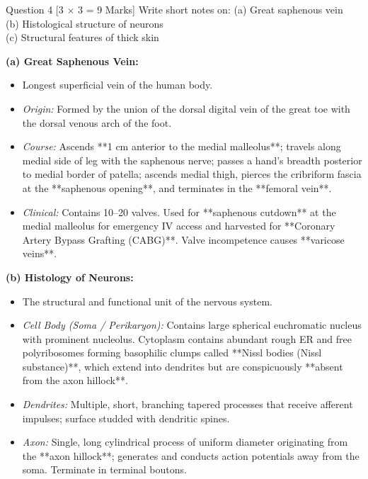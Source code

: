 \documentclass[11pt,a4paper]{article}
\begin{document}
\begin{qbox}{Question 4 [3 $\times$ 3 = 9 Marks]}
Write short notes on:
(a) Great saphenous vein \\
(b) Histological structure of neurons \\
(c) Structural features of thick skin
\end{qbox}

\begin{ansbox}
\textbf{(a) Great Saphenous Vein:}
\begin{itemize}[leftmargin=*]
    \item Longest superficial vein of the human body.
    \item \textit{Origin:} Formed by the union of the dorsal digital vein of the great toe with the dorsal venous arch of the foot.
    \item \textit{Course:} Ascends **1 cm anterior to the medial malleolus**; travels along medial side of leg with the saphenous nerve; passes a hand's breadth posterior to medial border of patella; ascends medial thigh, pierces the cribriform fascia at the **saphenous opening**, and terminates in the **femoral vein**.
    \item \textit{Clinical:} Contains 10--20 valves. Used for **saphenous cutdown** at the medial malleolus for emergency IV access and harvested for **Coronary Artery Bypass Grafting (CABG)**. Valve incompetence causes **varicose veins**.
\end{itemize}

\textbf{(b) Histology of Neurons:}
\begin{itemize}[leftmargin=*]
    \item The structural and functional unit of the nervous system.
    \item \textit{Cell Body (Soma / Perikaryon):} Contains large spherical euchromatic nucleus with prominent nucleolus. Cytoplasm contains abundant rough ER and free polyribosomes forming basophilic clumps called **Nissl bodies (Nissl substance)**, which extend into dendrites but are conspicuously **absent from the axon hillock**.
    \item \textit{Dendrites:} Multiple, short, branching tapered processes that receive afferent impulses; surface studded with dendritic spines.
    \item \textit{Axon:} Single, long cylindrical process of uniform diameter originating from the **axon hillock**; generates and conducts action potentials away from the soma. Terminate in terminal boutons.
\end{itemize}


\end{ansbox}
\end{document}
